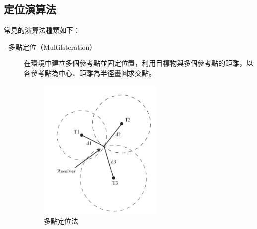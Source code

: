     \subsection{定位演算法}
    \label{chp:method-algorithm}
    常見的演算法種類如下：
    \begin{description}
        \item[- 多點定位（Multilateration）] 在環境中建立多個參考點並固定位置，利用目標物與多個參考點的距離，以各參考點為中心、距離為半徑畫圓求交點。
        \begin{figure}[ht]
            \centering
            \includegraphics[width=6cm]{ch2pic/multilateration.png}
            \caption{多點定位法\cite{survey_light2020}}
            \label{pic:multilateration}
        \end{figure}
    

\end{description}
